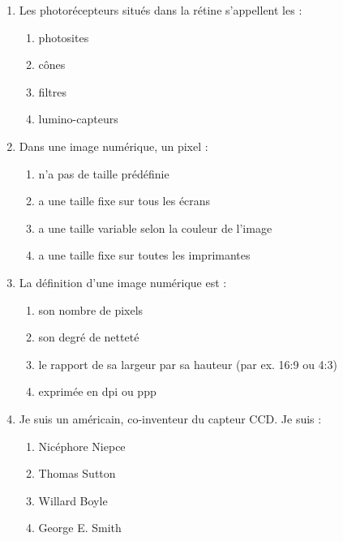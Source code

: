 \documentclass[a4paper]{article}
\begin{document}
\begin{enumerate}
  \item Les photorécepteurs situés dans la rétine s'appellent les :
    \begin{multicols}{4}
      \begin{enumerate}
	\item photosites
	\item cônes
	\item filtres
	\item lumino-capteurs
      \end{enumerate}
    \end{multicols}
  \item Dans une image numérique, un pixel :
    \begin{multicols}{4}
      \begin{enumerate}
	\item n'a pas de taille prédéfinie
	\item a une taille fixe sur tous les écrans
	\item a une taille variable selon la couleur de l'image
	\item a une taille fixe sur toutes les imprimantes
      \end{enumerate}
    \end{multicols}
  \item La définition d'une image numérique est :
    \begin{multicols}{4}
      \begin{enumerate}
	\item son nombre de pixels 
	\item son degré de netteté
	\item le rapport de sa largeur par sa hauteur (par ex. 16:9 ou 4:3)
	\item exprimée en dpi ou ppp
      \end{enumerate}
    \end{multicols}
  \item Je suis un américain, co-inventeur du capteur CCD. Je suis :
    \begin{multicols}{4}
      \begin{enumerate}
	\item Nicéphore Niepce
	\item Thomas Sutton
	\item Willard Boyle
	\item George E. Smith
      \end{enumerate}
    \end{multicols}
\end{enumerate}
\end{document}
